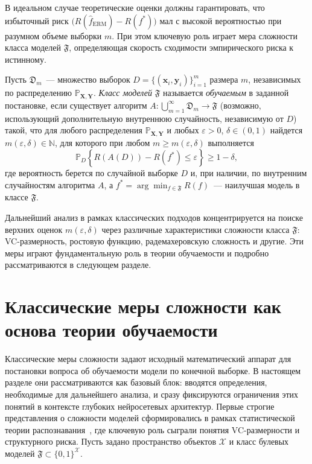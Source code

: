 В идеальном случае теоретические оценки должны гарантировать, что избыточный риск $\bigl(R(\hat{f}_{\mathrm{ERM}}) - R(f^{*})\bigr)$ мал с высокой вероятностью при разумном объеме выборки $m$. При этом ключевую роль играет мера сложности класса моделей $\mathfrak{F}$, определяющая скорость сходимости эмпирического риска к истинному.

\begin{definition}
    Пусть $\mathfrak{D}_m$~--- множество выборок $D = \{(\mathbf{x}_i,\mathbf{y}_i)\}_{i=1}^m$ размера $m$, независимых по распределению $\mathbb{P}_{\mathbf{X},\mathbf{Y}}$. \textit{Класс моделей} $\mathfrak{F}$ называется \textit{обучаемым} в заданной постановке, если существует алгоритм $A \colon \bigcup_{m=1}^{\infty} \mathfrak{D}_m \to \mathfrak{F}$ (возможно, использующий дополнительную внутреннюю случайность, независимую от $D$) такой, что для любого распределения $\mathbb{P}_{\mathbf{X},\mathbf{Y}}$ и любых $\varepsilon > 0$, $\delta \in (0,1)$ найдется $m(\varepsilon,\delta) \in \mathbb{N}$, для которого при любом $m \geq m(\varepsilon,\delta)$ выполняется
    \[
        \mathbb{P}_{D}\left\{ R(A(D)) - R(f^{*}) \leq \varepsilon \right\} \geq 1 - \delta,
    \]
    где вероятность берется по случайной выборке $D$ и, при наличии, по внутренним случайностям алгоритма $A$, а $f^{*} = \arg\min_{f \in \mathfrak{F}} R(f)$~--- наилучшая модель в классе $\mathfrak{F}$.
\end{definition}

Дальнейший анализ в рамках классических подходов концентрируется на поиске верхних оценок $m(\varepsilon,\delta)$ через различные характеристики сложности класса $\mathfrak{F}$: VC-размерность, ростовую функцию, радемахеровскую сложность и другие. Эти меры играют фундаментальную роль в теории обучаемости и подробно рассматриваются в следующем разделе.

\section{Классические меры сложности как основа теории обучаемости}

Классические меры сложности задают исходный математический аппарат для постановки вопроса об обучаемости модели по конечной выборке.
В настоящем разделе они рассматриваются как базовый блок: вводятся определения, необходимые для дальнейшего анализа, и сразу фиксируются ограничения этих понятий в контексте глубоких нейросетевых архитектур.
Первые строгие представления о сложности моделей сформировались в рамках статистической теории распознавания~\cite[глава~5]{vapnik1974StatTheory}, где ключевую роль сыграли понятия VC-размерности и структурного риска. Пусть задано пространство объектов $\mathcal{X}$ и класс булевых моделей $\mathfrak{F} \subset \{0,1\}^{\mathcal{X}}$.

